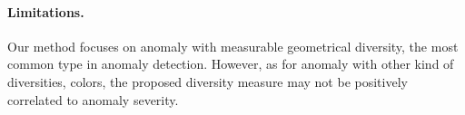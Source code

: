 \documentclass[10pt,twocolumn,letterpaper]{article}
\begin{document}
    \paragraph{Limitations.}
    Our method focuses on anomaly with measurable geometrical diversity, the most common type in anomaly detection. 
    However, as for anomaly with other kind of diversities, \eg colors, the proposed diversity measure may not be positively correlated to anomaly severity.

{\small


}
\end{document}
